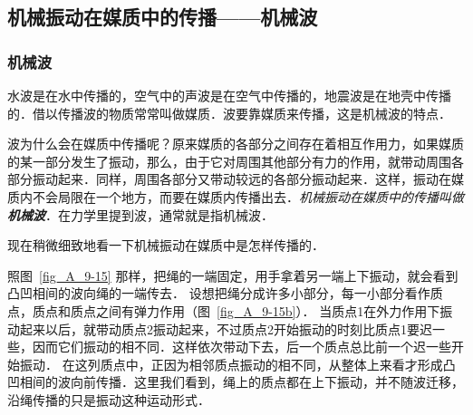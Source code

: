 \subsection{机械振动在媒质中的传播——机械波}
\subsubsection{机械波} 

水波是在水中传播的，空气中的声波是在空气中传播的，地震波是在地壳中传播的．借以传播波的物质常常叫做媒质．波要靠媒质来传播，这是机械波的特点．


波为什么会在媒质中传播呢？原来媒质的各部分之间存在着相互作用力，如果媒质的某一部分发生了振动，那么，由于它对周围其他部分有力的作用，就带动周围各部分振动起来．同样，周围各部分又带动较远的各部分振动起来．这样，振动在媒质内不会局限在一个地方，而要在媒质内传播出去．\textit{机械振动在媒质中的传播叫做\textbf{机械波}}．在力学里提到波，通常就是指机械波．

现在稍微细致地看一下机械振动在媒质中是怎样传播的．

照图~\ref{fig_A_9-15} 那样，把绳的一端固定，用手拿着另一端上下振动，就会看到凸凹相间的波向绳的一端传去．
设想把绳分成许多小部分，每一小部分看作质点，质点和质点之间有弹力作用（图~\ref{fig_A_9-15b}）．
当质点1在外力作用下振动起来以后，就带动质点2振动起来，不过质点2开始振动的时刻比质点1要迟一些，因而它们振动的相不同．这样依次带动下去，后一个质点总比前一个迟一些开始振动．
在这列质点中，正因为相邻质点振动的相不同，从整体上来看才形成凸凹相间的波向前传播．这里我们看到，绳上的质点都在上下振动，并不随波迁移，沿绳传播的只是振动这种运动形式．

